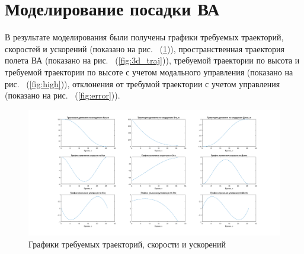 \section{Моделирование посадки ВА}
В результате моделирования были получены графики требуемых траекторий, скоростей и ускорений (показано на рис. ~(\ref{fig:init})), пространственная траектория полета ВА (показано на рис. ~(\ref{fig:3d_traj})), требуемой траектории по высота и требуемой траектории по высоте с учетом модального управления (показано на рис. ~(\ref{fig:high})), отклонения от требумой траектории с учетом управления (показано на рис. ~(\ref{fig:error})).
\begin{figure}[h]
	\centering
	\includegraphics[scale=0.36]{images/path_speed_boost.png}
	\caption{Графики требуемых траекторий, скорости и ускорений}
	\label{fig:init}
\end{figure}

